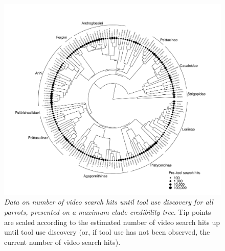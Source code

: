 \documentclass[
  man,floatsintext]{apa6}
\begin{document}
\newpage



\begin{figure}
\centering
\includegraphics{manuscript_files/figure-latex/plotPhylo4-1.pdf}
\caption{\label{fig:plotPhylo4}\emph{Data on number of video search hits until tool use discovery for all parrots, presented on a maximum clade credibility tree.} Tip points are scaled according to the estimated number of video search hits up until tool use discovery (or, if tool use has not been observed, the current number of video search hits).}
\end{figure}

\newpage
\end{document}
